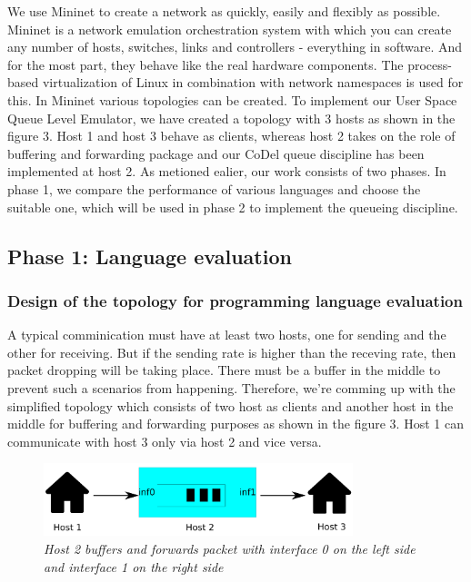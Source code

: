 We use Mininet to create a network as quickly, easily and flexibly as possible. Mininet is a network emulation orchestration system with which you can create any number of hosts, switches, links and controllers - everything in software. And for the most part, they behave like the real hardware components. The process-based virtualization of Linux in combination with network namespaces is used for this. \newline
In Mininet various topologies can be created. To implement our User Space Queue Level Emulator, we have created a topology with 3 hosts as shown in the figure 3. Host 1 and host 3 behave as clients, whereas host 2 takes on the role of buffering and forwarding package and our CoDel queue discipline has been implemented at host 2. As metioned ealier, our work consists of two phases. In phase 1, we compare the performance of various languages and choose the suitable one, which will be used in phase 2 to implement the queueing discipline.


\subsection{Phase 1: Language evaluation}
\subsubsection{Design of the topology for programming language evaluation}
A typical comminication must have at least two hosts, one for sending and the other for receiving. But if the sending rate is higher than the receving rate, then packet dropping will be taking place. There must be a buffer in the middle to prevent such a scenarios from happening. Therefore, we're comming up with the simplified topology which consists of two host as clients and another host in the middle for buffering and forwarding purposes as shown in the figure 3. Host 1 can communicate with host 3 only via host 2 and vice versa.
\begin{figure}[h]
\centering
\includegraphics*[width=9cm]{topology}
\caption{\em Host 2 buffers and forwards packet with interface 0 on the left side and interface 1 on the right side}
\end{figure} 

